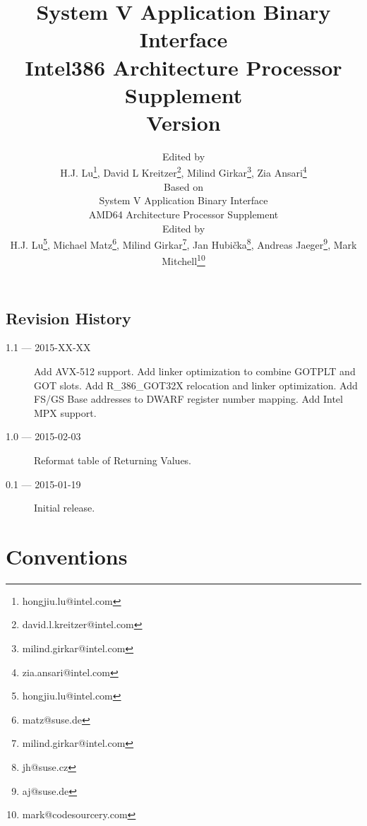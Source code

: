 \documentclass[12pt]{report}
\begin{document}
\author{Edited by\\
  H.J. Lu\thanks{hongjiu.lu@intel.com},
  David L Kreitzer\thanks{david.l.kreitzer@intel.com},
  Milind Girkar\thanks{milind.girkar@intel.com},
  Zia Ansari\thanks{zia.ansari@intel.com} \\
  \small
  Based on\\
  \small
  System V Application Binary Interface\\
  \small
  AMD64 Architecture Processor Supplement\\
  \small
  Edited by\\
  \small
  H.J. Lu\thanks{hongjiu.lu@intel.com},
  Michael Matz\thanks{matz@suse.de},
  Milind Girkar\thanks{milind.girkar@intel.com},
  Jan Hubi\v{c}ka\thanks{jh@suse.cz},
  Andreas Jaeger\thanks{aj@suse.de},
  Mark Mitchell\thanks{mark@codesourcery.com}}

\title{System V Application Binary Interface\\
{\Large Intel386 Architecture Processor Supplement\\
Version \version}}
\maketitle
\tableofcontents
\listoftables
\listoffigures

\section*{Revision History}

\begin{description}

\item[1.1 --- 2015-XX-XX] Add AVX-512 support.  Add linker optimization
to combine GOTPLT and GOT slots.  Add R_386_GOT32X relocation and linker
optimization.  Add FS/GS Base addresses to DWARF register number mapping.
Add Intel MPX support.
\item[1.0 --- 2015-02-03] Reformat table of Returning Values.
\item[0.1 --- 2015-01-19] Initial release.
\end{description}






\chapter{Conventions}



\appendix


\end{document}
